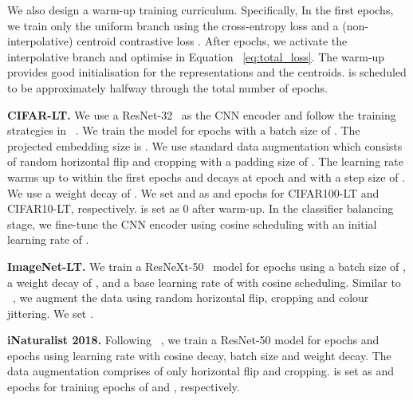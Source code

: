 We also design a warm-up training curriculum.
Specifically,
In the first  epochs, we train only the uniform branch using the cross-entropy loss  and a (non-interpolative) centroid contrastive loss .
After  epochs, we activate the interpolative branch and optimise  in Equation ~\ref{eq:total_loss}.
The warm-up provides good initialisation for the representations and the centroids.
 is scheduled to be approximately halfway through the total number of epochs. 

\textbf{CIFAR-LT.} We use a ResNet-32~\cite{resnet} as the CNN encoder and follow the training strategies in ~\cite{bbn}. 
We train the model for  epochs with a batch size of . 
The projected embedding size is . 
We use standard data augmentation which consists of random horizontal flip and cropping with a padding size of . 
The learning rate warms up to  within the first  epochs and decays at epoch  and  with a step size of . 
We use a weight decay of . 
We set  and  as  and  epochs for CIFAR100-LT and CIFAR10-LT, respectively.  
 is set as 0 after warm-up.
In the classifier balancing stage, we fine-tune the CNN encoder using cosine scheduling with an initial learning rate of .

\textbf{ImageNet-LT.} We train a ResNeXt-50~\cite{resnext} model for  epochs using a batch size of , a weight decay of ,
and a base learning rate of  with cosine scheduling. 
Similar to ~\cite{decouple-longtail}, we augment the data using random horizontal flip, cropping and colour jittering. 
We set .

\textbf{iNaturalist 2018.} Following ~\cite{decouple-longtail}, we train a ResNet-50 model for  epochs and  epochs using  learning rate with cosine decay,  batch size and  weight decay. The data augmentation comprises of only horizontal flip and cropping.  is set as  and  epochs for training epochs of  and , respectively.

